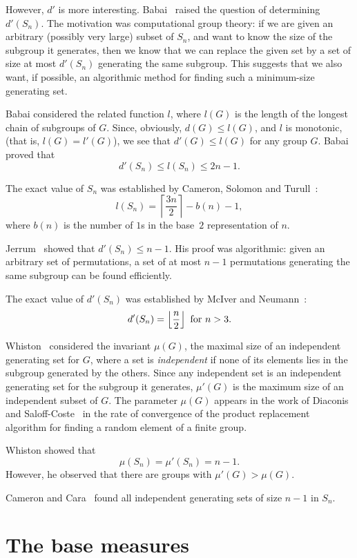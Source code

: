 \documentclass[12pt]{article}
\begin{document}
However, $d'$ is more interesting. Babai~\cite{babai} raised the question of
determining $d'(S_n)$. The motivation was computational group theory: if we
are given an arbitrary (possibly very large) subset of $S_n$, and want to
know the size of the subgroup it generates, then we know that we can replace
the given set by a set of size at most $d'(S_n)$ generating the same subgroup.
This suggests that we also want, if possible, an algorithmic method for
finding such a minimum-size generating set.

Babai considered the related function $l$, where $l(G)$ is the length of the
longest chain of subgroups of $G$. Since, obviously, $d(G)\le l(G)$, and
$l$ is monotonic, (that is, $l(G)=l'(G)$), we see that $d'(G)\le l(G)$
for any group $G$. Babai proved that
\[d'(S_n)\le l(S_n)\le 2n-1.\]

The exact value of $S_n$ was established by Cameron, Solomon and
Turull~\cite{cst}:
\[l(S_n)=\left\lceil\frac{3n}{2}\right\rceil-b(n)-1,\]
where $b(n)$ is the number of $1$s in the base~$2$ representation of $n$.

Jerrum~\cite{jerrum} showed that $d'(S_n)\le n-1$. His proof was
algorithmic: given an arbitrary set of permutations, a set of at most $n-1$
permutations generating the same subgroup can be found efficiently.

The exact value of $d'(S_n)$ was established by McIver and Neumann~\cite{mn}:
\[d'(S_n)=\left\lfloor\frac{n}{2}\right\rfloor\hbox{ for }n>3.\]

Whiston~\cite{whiston} considered the invariant $\mu(G)$, the maximal size
of an independent generating set for $G$, where a set is \emph{independent}
if none of its elements lies in the subgroup generated by the others. Since
any independent set is an independent generating set for the subgroup it
generates, $\mu'(G)$ is the maximum size of an independent subset of $G$.
The parameter $\mu(G)$ appears in the work of Diaconis and
Saloff-Coste~\cite{ds} in the rate of convergence of the product replacement
algorithm for finding a random element of a finite group.

Whiston showed that
\[\mu(S_n)=\mu'(S_n)=n-1.\]
However, he observed that there are groups with $\mu'(G)>\mu(G)$.

Cameron and Cara~\cite{cc} found all independent generating sets of size
$n-1$ in $S_n$.

\section{The base measures}
\end{document}

